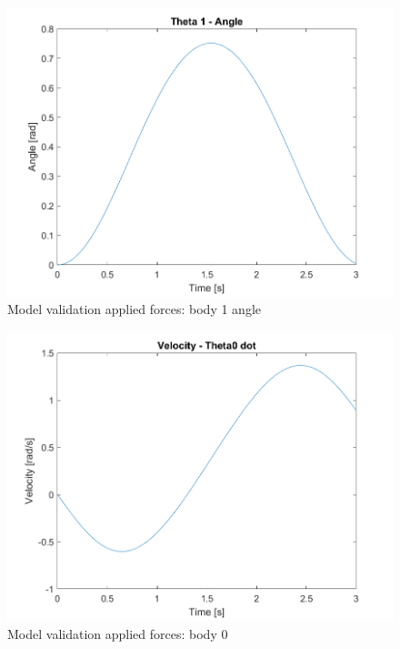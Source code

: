 \begin{figure}[H]
  \centering
  \includegraphics[scale=1]{graphics/Integration/theta1.png}
  \caption{Model validation applied forces: body 1 angle}
  \label{fig:Model validation applied forces: body 1 angular position}
\end{figure}

\begin{figure}[H]
  \centering
  \includegraphics[scale=1]{graphics/Integration/dtheta0.png}
  \caption{Model validation applied forces: body 0}
  \label{fig:Model validation applied forces: body 0 velocity}
\end{figure}